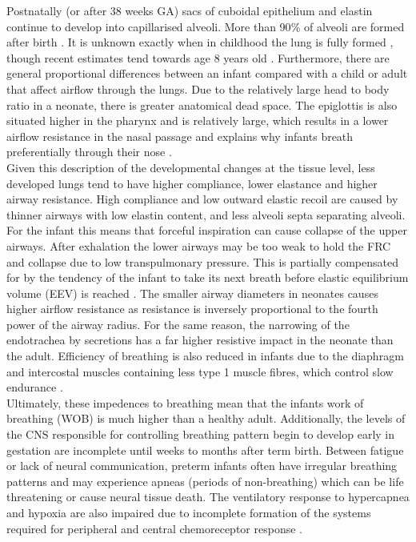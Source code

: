\documentclass[12pt, openany, oneside]{book}
\begin{document}
Postnatally (or after 38 weeks GA) sacs of cuboidal epithelium and elastin continue to develop into capillarised alveoli. More than 90{\%} of alveoli are formed after birth \citep{smith2010normal}. It is unknown exactly when in childhood the lung is fully formed \cite{burri1984fetal}, though recent estimates tend towards age 8 years old \citep{smith2010normal}. Furthermore, there are general proportional differences between an infant compared with a child or adult that affect airflow through the lungs. Due to the relatively large head to body ratio in a neonate, there is greater anatomical dead space. The epiglottis is also situated higher in the pharynx and is relatively large, which results in a lower airflow resistance in the nasal passage and explains why infants breath preferentially through their nose \citep{neumann}.  \\

Given this description of the developmental changes at the tissue level, less developed lungs tend to have higher compliance, lower elastance and higher airway resistance. High compliance and low outward elastic recoil are caused by thinner airways with low elastin content, and less alveoli septa separating alveoli. For the infant this means that forceful inspiration can cause  collapse of the upper airways. After exhalation the lower airways may be too weak to hold the FRC and collapse due to low transpulmonary pressure. This is partially compensated for by the tendency of the infant to take its next breath before elastic equilibrium volume (EEV) is reached \citep{manual}. The smaller airway diameters in neonates causes higher airflow resistance as resistance is inversely proportional to the fourth power of the airway radius. For the same reason, the narrowing of the endotrachea by secretions has a far higher resistive impact in the neonate than the adult. Efficiency of breathing is also reduced in infants due to the diaphragm and intercostal muscles containing less type 1 muscle fibres, which control slow endurance \citep{neumann}. \\


Ultimately, these impedences to breathing mean that the infants work of breathing (WOB) is much higher than a healthy adult.  Additionally, the levels of the CNS responsible for controlling breathing pattern begin to develop early in gestation are incomplete until weeks to months after term birth. Between fatigue or lack of neural communication, preterm infants often have irregular breathing patterns and may experience apneas (periods of non-breathing) which can be life threatening or cause neural tissue death. The ventilatory response to hypercapnea and hypoxia are also impaired due to incomplete formation of the systems required for peripheral and central chemoreceptor response \citep{neumann}. 
\end{document}
